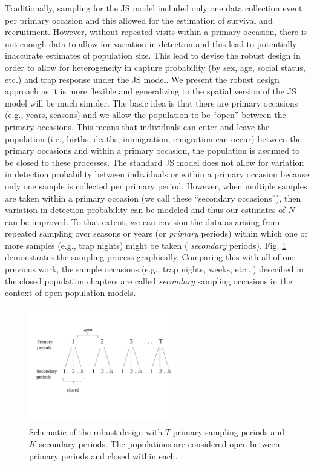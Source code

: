 Traditionally, sampling for the JS model included only one data collection event per primary occasion 
and this allowed for the estimation of survival and recruitment.  However, without repeated visits within
a primary occasion, there is not enough data to allow for variation in detection and this lead to potentially
inaccurate estimates of population size.
This lead \citet{pollock:1982} to devise the robust design in order to allow for
heterogeneity in capture probability (by sex, age, social status, etc.) and
trap response under the JS model.  
We present
the robust design approach as it is more flexible and generalizing to
the spatial version of the JS model will be much simpler.  The basic
idea is that there are primary occasions (e.g., years, seasons) and we
allow the population to be ``open'' between the primary occasions.
This means that individuals can enter and leave the population (i.e.,
births, deaths, immigration, emigration can occur) between the primary
occasions and within a primary occasion, the population is assumed to
be closed to these processes.  The standard JS model does not allow
for variation in detection probability between individuals or within a
primary occasion because only one sample is collected per primary
period.  However, when multiple samples are taken within a primary
occasion (we call these ``secondary occasions''), then variation in
detection probability can be modeled and thus our estimates of $N$ can
be improved.  To that extent, we can envision the data as arising from
repeated sampling over seasons or years (or {\it primary} periods)
within which one or more samples (e.g., trap nights) might be taken ({\it
  secondary} periods). Fig. \ref{open.figs.robustdesign} demonstrates
the sampling process graphically.  Comparing this with all of our
previous work, the sample occasions 
(e.g., trap nights, weeks, etc$\dots$) described in the closed
population chapters are called {\it secondary} sampling occasions in the context of open population models.



\begin{figure}[h]
\centering
\includegraphics[height=2in,width=2.5in]{Ch16-Open/figs/RobustDesign.pdf}
\caption{Schematic of the robust design with $T$ primary sampling periods and $K$ secondary periods. The populations
are considered open between primary periods and closed within each.}
\label{open.figs.robustdesign}
\end{figure}

